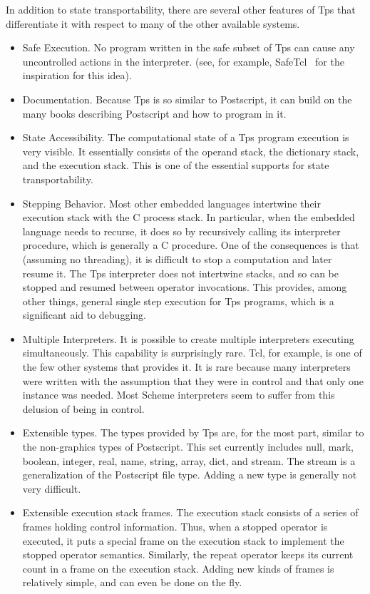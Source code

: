 In addition to state transportability,
there are several other features of Tps that
differentiate it with respect to many
of the other available systems.
\begin{itemize}
\item Safe Execution.
No program written in the safe subset of Tps
can cause any uncontrolled actions in the interpreter.
(see, for example, SafeTcl~\cite{safetcl93a}
for the inspiration for this idea).
\item Documentation.
Because Tps is so similar to Postscript,
it can build on the many books describing
Postscript and how to program in it.
\item State Accessibility.  The computational state of a Tps program
execution is very visible.  It essentially consists of
the operand stack, the dictionary
stack, and the execution stack.
This is one of the essential supports for state transportability.
\item Stepping Behavior.
Most other embedded languages intertwine their execution
stack with the C process stack.  In particular, when the embedded
language needs to recurse, it does so by recursively calling
its interpreter procedure, which is generally a C procedure.
One of the consequences is that (assuming no threading), it is
difficult to stop a computation and later resume it.
The Tps interpreter does not intertwine stacks, and so can be
stopped and resumed between operator invocations.
This provides, among other things, general single step execution
for Tps programs, which is a significant aid to debugging.
\item Multiple Interpreters.
It is possible to create multiple interpreters executing simultaneously.
This capability is surprisingly rare.  Tcl, for example,
is one of the few
other systems that provides it.
It is rare because many interpreters
were written with the assumption that they were in control
and that only one instance was needed.  Most Scheme interpreters
seem to suffer from this delusion of being in control.
\item Extensible types.
The types provided by Tps are, for the most part, similar to the
non-graphics types of Postscript.  This set currently includes
null, mark, boolean, integer, real, name, string, array, dict, and
stream.  The stream is a generalization of the Postscript file type.
Adding a new type is generally not very difficult.
\item Extensible execution stack frames.
The execution stack consists of a series of frames holding
control information.  Thus, when a stopped operator is executed,
it puts a special frame on the execution stack to implement the stopped
operator semantics.  Similarly, the repeat operator keeps its current count
in a frame on the execution stack.
Adding new kinds of frames is relatively simple, and can even be done
on the fly.
\end{itemize}

